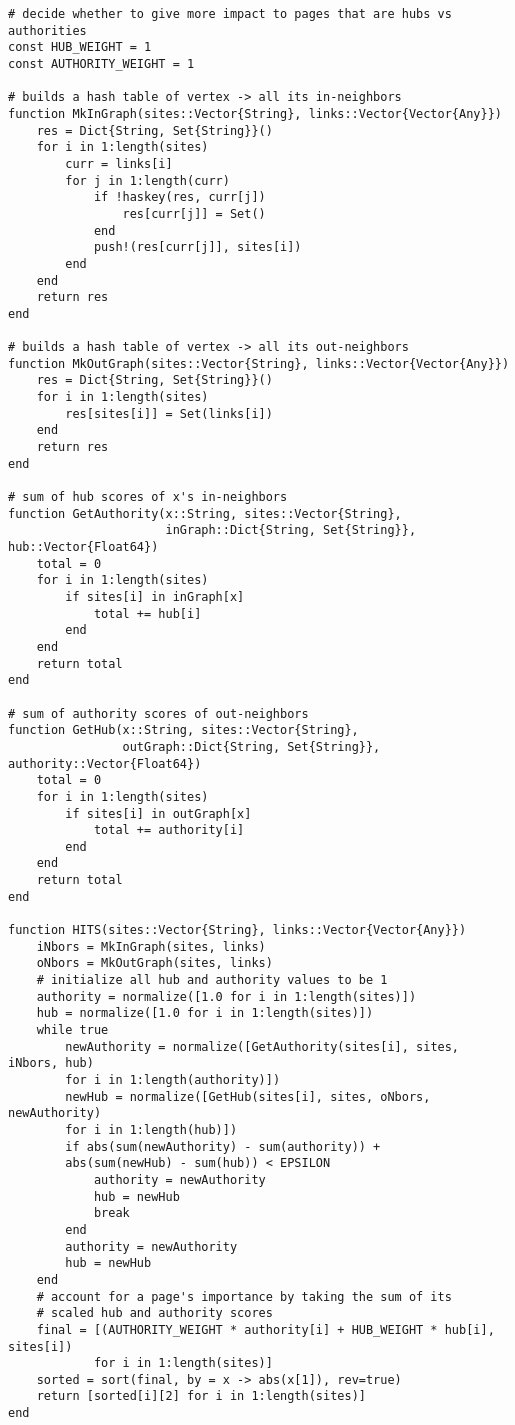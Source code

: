 \documentclass{article}
\begin{document}
\begin{verbatim}
# decide whether to give more impact to pages that are hubs vs authorities
const HUB_WEIGHT = 1
const AUTHORITY_WEIGHT = 1

# builds a hash table of vertex -> all its in-neighbors
function MkInGraph(sites::Vector{String}, links::Vector{Vector{Any}})
    res = Dict{String, Set{String}}()
    for i in 1:length(sites)
        curr = links[i]
        for j in 1:length(curr)
            if !haskey(res, curr[j])
                res[curr[j]] = Set()
            end
            push!(res[curr[j]], sites[i])
        end
    end
    return res
end

# builds a hash table of vertex -> all its out-neighbors
function MkOutGraph(sites::Vector{String}, links::Vector{Vector{Any}})
    res = Dict{String, Set{String}}()
    for i in 1:length(sites)
        res[sites[i]] = Set(links[i])
    end
    return res
end

# sum of hub scores of x's in-neighbors
function GetAuthority(x::String, sites::Vector{String}, 
                      inGraph::Dict{String, Set{String}}, hub::Vector{Float64})
    total = 0
    for i in 1:length(sites)
        if sites[i] in inGraph[x]
            total += hub[i]
        end
    end
    return total
end

# sum of authority scores of out-neighbors
function GetHub(x::String, sites::Vector{String}, 
                outGraph::Dict{String, Set{String}}, authority::Vector{Float64})
    total = 0
    for i in 1:length(sites)
        if sites[i] in outGraph[x]
            total += authority[i]
        end
    end
    return total
end

function HITS(sites::Vector{String}, links::Vector{Vector{Any}})
    iNbors = MkInGraph(sites, links)
    oNbors = MkOutGraph(sites, links)
    # initialize all hub and authority values to be 1
    authority = normalize([1.0 for i in 1:length(sites)])
    hub = normalize([1.0 for i in 1:length(sites)])
    while true
        newAuthority = normalize([GetAuthority(sites[i], sites, iNbors, hub) 
        for i in 1:length(authority)])
        newHub = normalize([GetHub(sites[i], sites, oNbors, newAuthority) 
        for i in 1:length(hub)])
        if abs(sum(newAuthority) - sum(authority)) +
        abs(sum(newHub) - sum(hub)) < EPSILON
            authority = newAuthority
            hub = newHub
            break
        end 
        authority = newAuthority
        hub = newHub
    end
    # account for a page's importance by taking the sum of its 
    # scaled hub and authority scores
    final = [(AUTHORITY_WEIGHT * authority[i] + HUB_WEIGHT * hub[i], sites[i]) 
            for i in 1:length(sites)]
    sorted = sort(final, by = x -> abs(x[1]), rev=true)
    return [sorted[i][2] for i in 1:length(sites)]
end
\end{verbatim}
\end{document}
